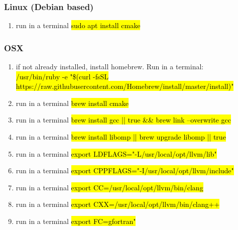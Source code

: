 \documentclass{book}
\begin{document}
\subsubsection{Linux (Debian based)}
\begin{enumerate}
    \item run in a terminal \hl{sudo apt install cmake}
\end{enumerate}
\subsubsection{OSX}
\begin{enumerate}
    \item if not already installed, install homebrew. Run in a terminal:\\ \hl{/usr/bin/ruby -e "\$(curl -fsSL https://raw.githubusercontent.com/Homebrew/install/master/install)"}
    \item run in a terminal \hl{brew install cmake} 
    \item run in a terminal \hl{brew install gcc || true  \&\& brew link --overwrite gcc} 
    \item run in a terminal \hl{brew install libomp || brew upgrade libomp || true}
    \item run in a terminal \hl{export LDFLAGS="-L/usr/local/opt/llvm/lib"}
    \item run in a terminal \hl{export CPPFLAGS="-I/usr/local/opt/llvm/include"}
    \item run in a terminal \hl{export CC=/usr/local/opt/llvm/bin/clang}
    \item run in a terminal \hl{export  CXX=/usr/local/opt/llvm/bin/clang++}
    \item run in a terminal \hl{export FC=gfortran"}
\end{enumerate}
\end{document}
